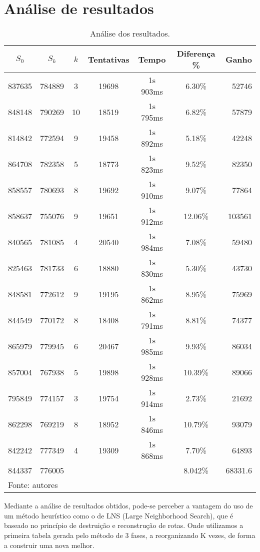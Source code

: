 \documentclass[12pt,a4paper]{article}
\renewcommand*{\arraystretch}{1.2}
\begin{document}
\section{Análise de resultados}

\begin{table}[H]
	\renewcommand{\arraystretch}{1}
	\centering
	\caption{Análise dos resultados.}
	\label{tab:resultados}
	\begin{tabular}{*{6}{c} r}
		\toprule 
		$S_{0}$ & $S_{k}$ & $k$ & Tentativas & Tempo & Diferença \% & Ganho \\ 
		\midrule
		837635 & 784889 &  3 & 19698 & 1s 903ms &  6.30\% &  52746 \\
		848148 & 790269 & 10 & 18519 & 1s 795ms &  6.82\% &  57879 \\
		814842 & 772594 &  9 & 19458 & 1s 892ms &  5.18\% &  42248 \\
		864708 & 782358 &  5 & 18773 & 1s 823ms &  9.52\% &  82350 \\
		858557 & 780693 &  8 & 19692 & 1s 910ms &  9.07\% &  77864 \\
		858637 & 755076 &  9 & 19651 & 1s 912ms & 12.06\% & 103561 \\
		840565 & 781085 &  4 & 20540 & 1s 984ms &  7.08\% &  59480 \\
		825463 & 781733 &  6 & 18880 & 1s 830ms &  5.30\% &  43730 \\
		848581 & 772612 &  9 & 19195 & 1s 862ms &  8.95\% &  75969 \\
		844549 & 770172 &  8 & 18408 & 1s 791ms &  8.81\% &  74377 \\
		865979 & 779945 &  6 & 20467 & 1s 985ms &  9.93\% &  86034 \\
		857004 & 767938 &  5 & 19898 & 1s 928ms & 10.39\% &  89066 \\
		795849 & 774157 &  3 & 19754 & 1s 914ms &  2.73\% &  21692 \\
		862298 & 769219 &  8 & 18952 & 1s 846ms & 10.79\% &  93079 \\
		842242 & 777349 &  4 & 19309 & 1s 868ms &  7.70\% &  64893 \\
		\midrule
		844337 & 776005 &    &       &          &  8.042\% &  68331.6 \\
		\bottomrule
		\multicolumn{6}{l}{\footnotesize Fonte: autores}
	\end{tabular}
\end{table}

Mediante a análise de resultados obtidos, pode-se perceber a vantagem do uso de um método heurístico como o de LNS (Large Neighborhood Search), que é baseado no princípio de destruição e reconstrução de rotas. Onde utilizamos a primeira tabela gerada pelo método de 3 fases, a reorganizando K vezes, de forma a construir uma nova melhor. 
\end{document}
